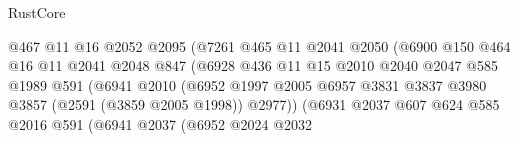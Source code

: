 \begin{lexlean}{RustCore}
\begin{coremodule}
                                      @467
                                      @11
                                      @16
                                      @2052
                                      @2095
                                      (@7261
                                        @465
                                        @11
                                        @2041
                                        @2050
                                        (@6900
                                          @150
                                          @464
                                          @16
                                          @11
                                          @2041
                                          @2048
                                          @847
                                          (@6928
                                            @436
                                            @11
                                            @15
                                            @2010
                                            @2040
                                            @2047
                                            @585
                                            @1989
                                            @591
                                            (@6941
                                              @2010
                                              (@6952
                                                @1997
                                                @2005
                                                @6957
                                                @3831
                                                @3837
                                                @3980
                                                @3857
                                                (@2591 (@3859 @2005 @1998))
                                                @2977))
                                            (@6931
                                              @2037
                                              @607
                                              @624
                                              @585
                                              @2016
                                              @591
                                              (@6941
                                                @2037
                                                (@6952
                                                  @2024
                                                  @2032

\end{coremodule}
\end{lexlean}

